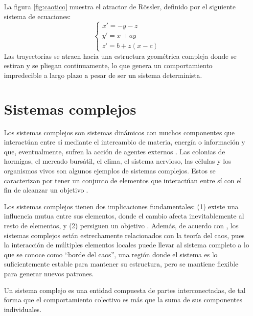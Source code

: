 \begin{enumerate}
	La figura \ref{fig:caotico} muestra el atractor de Rössler, definido por el siguiente sistema de ecuaciones:
	\begin{equation*}
		\begin{cases}
			x' = -y - z \\
			y' = x + ay \\
			z' = b + z(x - c)
		\end{cases}
	\end{equation*}
	Las trayectorias se atraen hacia una estructura geométrica compleja donde se estiran y se pliegan continuamente, lo que genera un comportamiento impredecible a largo plazo a pesar de ser un sistema determinista.
\end{enumerate}

\section{Sistemas complejos}

Los sistemas complejos son sistemas dinámicos con muchos componentes que interactúan entre sí mediante el intercambio de materia, energía o información y que, eventualmente, sufren la acción de agentes externos \cite{Torres2025_complejo}. Las colonias de hormigas, el mercado bursátil, el clima, el sistema nervioso, las células y los organismos vivos son algunos ejemplos de sistemas complejos. Estos se caracterizan por tener un conjunto de elementos que interactúan entre sí con el fin de alcanzar un objetivo \cite{Zelinka2014_cs, Zelinka2018_cs}. 

Los sistemas complejos tienen dos implicaciones fundamentales: (1) existe una influencia mutua entre sus elementos, donde el cambio afecta inevitablemente al resto de elementos, y (2) persiguen un objetivo \cite{Zelinka2018_cs}. Además, de acuerdo con \cite{sole1996_cs_caos}, los sistemas complejos están estrechamente relacionados con la teoría del caos, pues la interacción de múltiples elementos locales puede llevar al sistema completo a lo que se conoce como ``borde del caos'', una región donde el sistema es lo suficientemente estable para mantener su estructura, pero se mantiene flexible para generar nuevos patrones.

\begin{definition}
	Un sistema complejo es una entidad compuesta de partes interconectadas, de tal forma que el comportamiento colectivo es más que la suma de sus componentes individuales.
\end{definition}

